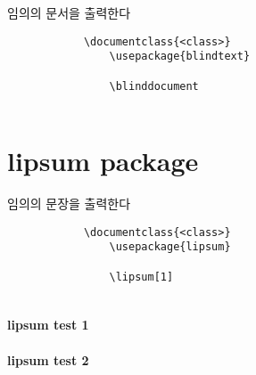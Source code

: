 		 임의의 문서을 출력한다


		\setlength{\fboxsep}{4pt}
		\setlength{\fboxrule}{1pt}
		\begin{framed}
		\begin{verbatim}
			\documentclass{<class>}
			    \usepackage{blindtext}
			    
			    \blinddocument
			
		\end{verbatim}
		\end{framed}


			    \blinddocument



	\clearpage
	\section{lipsum package}


		 임의의 문장을 출력한다
	
		\setlength{\fboxsep}{4pt}
		\setlength{\fboxrule}{1pt}
		\begin{framed}
		\begin{verbatim}
			\documentclass{<class>}
			    \usepackage{lipsum}
			    
			    \lipsum[1]
			
		\end{verbatim}
		\end{framed}
	
	
	\paragraph{lipsum test 1}
	\lipsum[1]
	
	\paragraph{lipsum test 2}
	\lipsum[2]




















